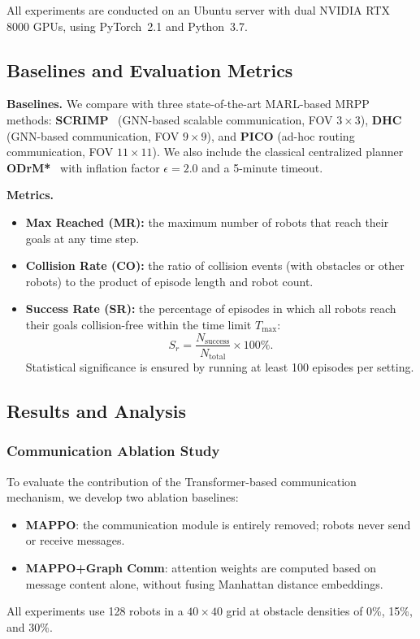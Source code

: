 \documentclass[conference]{IEEEtran}
\begin{document}
All experiments are conducted on an Ubuntu server with dual NVIDIA
RTX 8000 GPUs, using PyTorch~2.1 and Python~3.7.

\subsection{Baselines and Evaluation Metrics}

\textbf{Baselines.}
We compare with three state-of-the-art MARL-based MRPP methods:
\textbf{SCRIMP}~\cite{wang2023scrimp} (GNN-based scalable
communication, FOV $3\!\times\!3$),
\textbf{DHC}~\cite{ma2021distributed} (GNN-based communication,
FOV $9\!\times\!9$), and
\textbf{PICO} (ad-hoc routing communication, FOV
$11\!\times\!11$).
We also include the classical centralized planner
\textbf{ODrM*}~\cite{ellis2021mapf} with inflation factor
$\epsilon\!=\!2.0$ and a 5-minute timeout.

\textbf{Metrics.}
\begin{itemize}
\item \textbf{Max Reached (MR):} the maximum number of robots
  that reach their goals at any time step.
\item \textbf{Collision Rate (CO):} the ratio of collision events
  (with obstacles or other robots) to the product of episode
  length and robot count.
\item \textbf{Success Rate (SR):} the percentage of episodes in
  which all robots reach their goals collision-free within the
  time limit $T_{\max}$:
  \begin{equation}\label{eq:sr}
    S_r = \frac{N_{\mathrm{success}}}{N_{\mathrm{total}}}
        \times 100\%.
  \end{equation}
  Statistical significance is ensured by running at least 100
  episodes per setting.
\end{itemize}

\subsection{Results and Analysis}

\subsubsection{Communication Ablation Study}

To evaluate the contribution of the Transformer-based
communication mechanism, we develop two ablation baselines:
\begin{itemize}
\item \textbf{MAPPO}: the communication module is entirely
  removed; robots never send or receive messages.
\item \textbf{MAPPO+Graph Comm}: attention weights are computed
  based on message content alone, without fusing Manhattan
  distance embeddings.
\end{itemize}
All experiments use 128 robots in a $40\!\times\!40$ grid at
obstacle densities of 0\%, 15\%, and 30\%.
\end{document}
